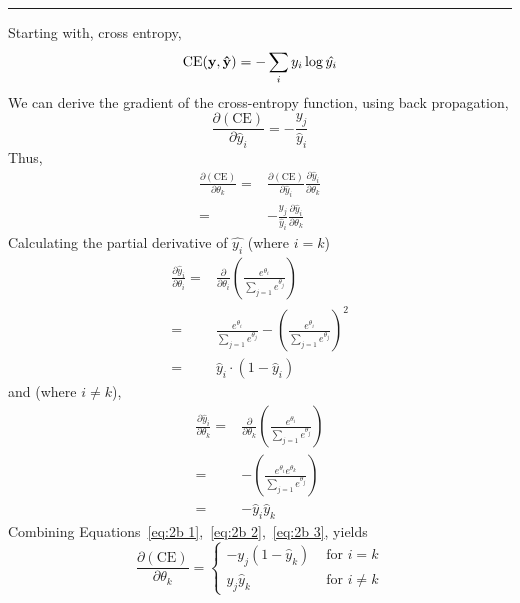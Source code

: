 \documentclass[letter,12pt]{article}
\begin{document}
\noindent\rule{\textwidth}{0.4pt}\vspace{5mm}
Starting with, cross entropy,
\begin{equation}
\textrm{CE}({\bf y},{\bf\hat{y}}) = -\sum_{i}{y_{i}\log{\hat{y_{i}}}}
\end{equation}
We can derive the gradient of the cross-entropy function, using back propagation,
\begin{equation}
\frac{\partial(\textrm{CE})}{\partial{\hat{y}_{i}}} = -\frac{y_{j}}{\hat{y}_{i}}\label{eq:2b 1}
\end{equation}
Thus,
\begin{align}
\frac{\partial(\textrm{CE})}{\partial{\theta_{k}}} = & \frac{\partial(\textrm{CE})}{\partial{\hat{y}_{i}}}\frac{\partial{\hat{y}_{i}}}{\partial{\theta_{k}}} \\
                                                                        = & -\frac{y_{j}}{\hat{y}_{i}}\frac{\partial{\hat{y}_{i}}}{\partial{\theta_{k}}}
\end{align}
Calculating the partial derivative of $\hat{y_{i}}$ (where $i=k$)
\begin{align}
\frac{\partial{\hat{y}_{i}}}{\partial{\theta_{i}}} = & \frac{\partial}{\partial{\theta_{i}}}\left( \frac{e^{\theta_{i}}}{\sum_{j=1}{e^{\theta_{j}}}}\right) \\
                                                                      = & \frac{e^{\theta_{i}}}{\sum_{j=1}{e^{\theta_{j}}}} - \left(\frac{e^{\theta_{i}}}{\sum_{j=1}{e^{\theta_{j}}}}\right)^{2} \\
                                                                      = & \hat{y}_{i}\cdot(1 - \hat{y}_{i})\label{eq:2b 2}
\end{align}
and (where $i\neq k$),
\begin{align}
\frac{\partial{\hat{y}_{i}}}{\partial{\theta_{k}}} = & \frac{\partial}{\partial{\theta_{k}}}\left( \frac{e^{\theta_{i}}}{\sum_{j=1}{e^{\theta_{j}}}}\right) \\
                                                                       = & - \left(\frac{e^{\theta_{i}}e^{\theta_{k}}}{\sum_{j=1}{e^{\theta_{j}}}}\right) \\
                                                                       = & - \hat{y}_{i}\hat{y}_{k}\label{eq:2b 3}
\end{align}
Combining Equations~\ref{eq:2b 1},~\ref{eq:2b 2},~\ref{eq:2b 3}, yields
\begin{equation}
\frac{\partial(\textrm{CE})}{\partial{\theta_{k}}} = \begin{cases}
-y_{j}(1 - \hat{y}_{k})&\text{ for }i=k \\
y_{j}\hat{y}_{k}&\text{ for }i\neq k
\end{cases}
\end{equation}
\end{document}
